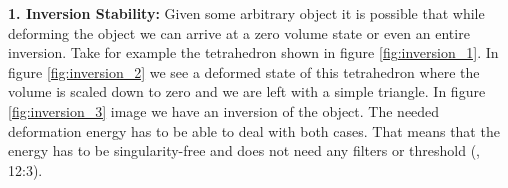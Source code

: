 \textbf{1. Inversion Stability:} Given some arbitrary object it is possible that while deforming the object we can arrive at a zero volume state or even an entire inversion. Take for example the tetrahedron shown in figure \ref{fig:inversion_1}. In figure \ref{fig:inversion_2} we see a deformed state of this tetrahedron where the volume is scaled down to zero and we are left with a simple triangle. In figure \ref{fig:inversion_3} image we have an inversion of the object. The needed deformation energy has to be able to deal with both cases. That means that the energy has to be singularity-free and does not need any filters or threshold (\cite{Smith:2018:SNF:3191713.3180491}, 12:3).


